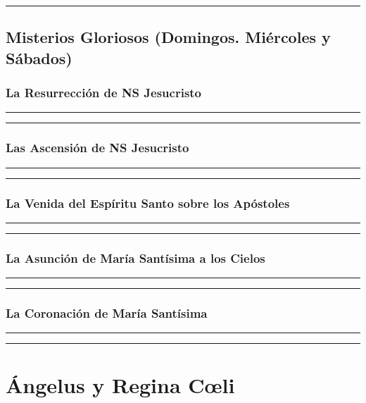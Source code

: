 \documentclass[11pt,a4paper]{report}
\begin{document}
\rule{\textwidth}{0.5pt}


\subsection*{Misterios Gloriosos (Domingos. Miércoles y Sábados)}

\subsubsection*{La Resurrección de NS Jesucristo}

\rule{\textwidth}{0.5pt}

\rule{\textwidth}{0.5pt}


\subsubsection*{Las Ascensión de NS Jesucristo}


\rule{\textwidth}{0.5pt}

\rule{\textwidth}{0.5pt}

\subsubsection*{La Venida del Espíritu Santo sobre los Apóstoles}


\rule{\textwidth}{0.5pt}

\rule{\textwidth}{0.5pt}


\subsubsection*{La Asunción de María Santísima a los Cielos}


\rule{\textwidth}{0.5pt}

\rule{\textwidth}{0.5pt}


\subsubsection*{La Coronación de María Santísima}


\rule{\textwidth}{0.5pt}

\rule{\textwidth}{0.5pt}


\section*{Ángelus y Regina Cœli}

\end{document}
